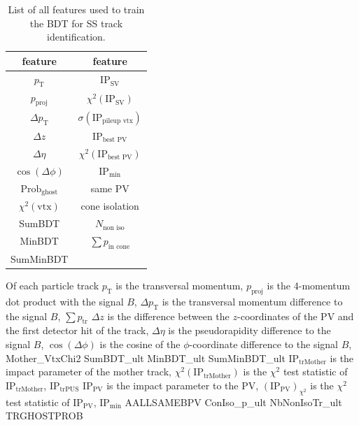 \begin{table}
    \centering
    \caption{List of all features used to train the BDT for SS track identification.}
    \label{tab:SS_features}
    \begin{tabular}{c c}
        \toprule
        feature & feature \\
        \midrule
        $p_\text{T}$        & $\text{IP}_\text{SV}$ \\ 
        $p_\text{proj}$     & $\chi^2(\text{IP}_\text{SV})$ \\ 
        $\Delta p_\text{T}$ & $\sigma(\text{IP}_\text{pileup vtx})$ \\ 
        $\Delta z$          & $\text{IP}_\text{best PV}$ \\    
        $\Delta \eta$       & $\chi^2(\text{IP}_\text{best PV})$ \\ 
        $\cos(\Delta \phi)$ & $\text{IP}_\text{min}$ \\ 
        $\text{Prob}_\text{ghost}$ & same PV \\
        $\chi^2(\text{vtx})$     & cone isolation \\
        SumBDT              & $N_\text{non iso}$ \\ 
        MinBDT              & $\sum p_\text{in cone}$ \\ 
        SumMinBDT           &  \\
        \bottomrule
    \end{tabular}
\end{table}

Of each particle track 
$p_\text{T}$ is the transversal momentum, 
$p_\text{proj}$ is the 4-momentum dot product with the signal $B$,
$\Delta p_\text{T}$ is the transversal momentum difference to the signal $B$,
$\sum p_\text{tr}$ 
$\Delta z$ is the difference between the $z$-coordinates of the PV and the first detector hit of the track,        
$\Delta \eta$ is the pseudorapidity difference to the signal $B$,     
$\cos(\Delta \phi)$ is the cosine of the $\phi$-coordinate difference to the signal $B$, 
Mother\_VtxChi2    
SumBDT\_ult        
MinBDT\_ult        
SumMinBDT\_ult
$\text{IP}_\text{trMother}$ is the impact parameter of the mother track, 
$\chi^2(\text{IP}_\text{trMother})$ is the $\chi^2$ test statistic of $\text{IP}_\text{trMother}$,
$\text{IP}_\text{trPUS}$ 
$\text{IP}_\text{PV}$ is the impact parameter to the PV,    
$(\text{IP}_\text{PV})_{\chi^2}$ is the $\chi^2$ test statistic of $\text{IP}_\text{PV}$,
$\text{IP}_\text{min}$  
AALLSAMEBPV  
ConIso\_p\_ult 
NbNonIsoTr\_ult  
TRGHOSTPROB      



